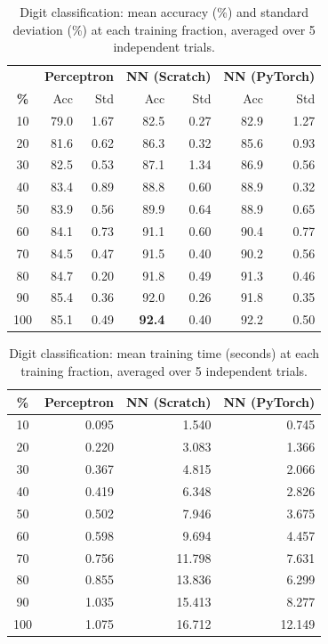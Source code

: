 \documentclass[12pt]{article}
\begin{document}
\begin{table}[H]
\centering
\caption{Digit classification: mean accuracy (\%) and standard deviation (\%) at each
training fraction, averaged over 5 independent trials.}
\label{tab:digits_full}
\setlength{\tabcolsep}{5pt}
\begin{tabular}{c|rr|rr|rr}
\toprule
 & \multicolumn{2}{c|}{\textbf{Perceptron}}
 & \multicolumn{2}{c|}{\textbf{NN (Scratch)}}
 & \multicolumn{2}{c}{\textbf{NN (PyTorch)}} \\
\textbf{\%} & Acc & Std & Acc & Std & Acc & Std \\
\midrule
 10 & 79.0 & 1.67 & 82.5 & 0.27 & 82.9 & 1.27 \\
 20 & 81.6 & 0.62 & 86.3 & 0.32 & 85.6 & 0.93 \\
 30 & 82.5 & 0.53 & 87.1 & 1.34 & 86.9 & 0.56 \\
 40 & 83.4 & 0.89 & 88.8 & 0.60 & 88.9 & 0.32 \\
 50 & 83.9 & 0.56 & 89.9 & 0.64 & 88.9 & 0.65 \\
 60 & 84.1 & 0.73 & 91.1 & 0.60 & 90.4 & 0.77 \\
 70 & 84.5 & 0.47 & 91.5 & 0.40 & 90.2 & 0.56 \\
 80 & 84.7 & 0.20 & 91.8 & 0.49 & 91.3 & 0.46 \\
 90 & 85.4 & 0.36 & 92.0 & 0.26 & 91.8 & 0.35 \\
100 & 85.1 & 0.49 & \textbf{92.4} & 0.40 & 92.2 & 0.50 \\
\bottomrule
\end{tabular}
\end{table}

\begin{table}[H]
\centering
\caption{Digit classification: mean training time (seconds) at each training fraction,
averaged over 5 independent trials.}
\label{tab:digits_time}
\setlength{\tabcolsep}{7pt}
\begin{tabular}{c|r|r|r}
\toprule
\textbf{\%} & \textbf{Perceptron} & \textbf{NN (Scratch)} & \textbf{NN (PyTorch)} \\
\midrule
 10 & 0.095  & 1.540  & 0.745  \\
 20 & 0.220  & 3.083  & 1.366  \\
 30 & 0.367  & 4.815  & 2.066  \\
 40 & 0.419  & 6.348  & 2.826  \\
 50 & 0.502  & 7.946  & 3.675  \\
 60 & 0.598  & 9.694  & 4.457  \\
 70 & 0.756  & 11.798 & 7.631  \\
 80 & 0.855  & 13.836 & 6.299  \\
 90 & 1.035  & 15.413 & 8.277  \\
100 & 1.075  & 16.712 & 12.149 \\
\bottomrule
\end{tabular}
\end{table}
\end{document}
